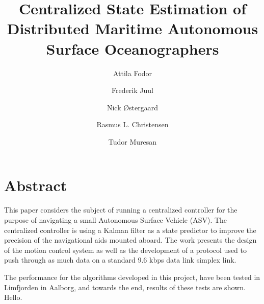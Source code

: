 \documentclass{article}
\begin{document}
\title{Centralized State Estimation of Distributed Maritime Autonomous Surface Oceanographers}
\author{Attila Fodor \and Frederik Juul \and Nick \O stergaard \and Rasmus L. Christensen \and Tudor Muresan}
\maketitle
\section*{Abstract}
This paper considers the subject of running a centralized controller for the purpose of navigating a small Autonomous Surface Vehicle (ASV). The centralized controller is using a Kalman filter as a state predictor to improve the precision of the navigational aids mounted aboard. The work presents the design of the motion control system as well as the development of a protocol used to push through as much data on a standard 9.6 kbps data link simplex link.

The performance for the algorithms developed in this project, have been tested in Limfjorden in Aalborg, and towards the end, results of these tests are shown. Hello.
\end{document}

